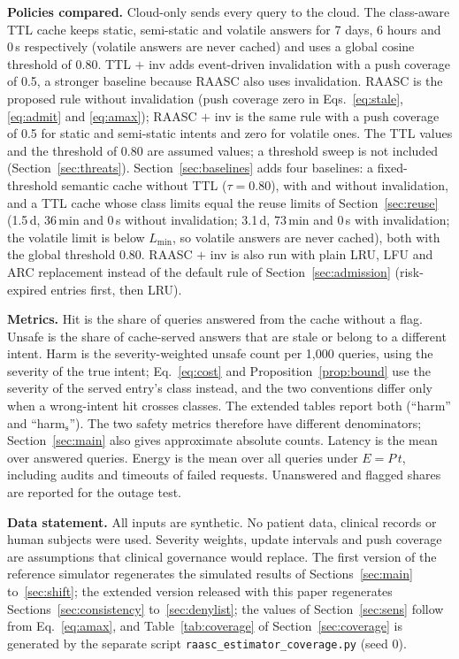 \documentclass[journal]{IEEEtran}
\begin{document}
\textbf{Policies compared.} Cloud-only sends every query to the cloud. The class-aware TTL cache keeps static, semi-static and volatile answers for 7 days, 6 hours and 0\,s respectively (volatile answers are never cached) and uses a global cosine threshold of 0.80. TTL $+$ inv adds event-driven invalidation with a push coverage of 0.5, a stronger baseline because RAASC also uses invalidation. RAASC is the proposed rule without invalidation (push coverage zero in Eqs.~\eqref{eq:stale}, \eqref{eq:admit} and \eqref{eq:amax}); RAASC $+$ inv is the same rule with a push coverage of 0.5 for static and semi-static intents and zero for volatile ones. The TTL values and the threshold of 0.80 are assumed values; a threshold sweep is not included (Section~\ref{sec:threats}). Section~\ref{sec:baselines} adds four baselines: a fixed-threshold semantic cache without TTL ($\tau=0.80$), with and without invalidation, and a TTL cache whose class limits equal the reuse limits of Section~\ref{sec:reuse} (1.5\,d, 36\,min and 0\,s without invalidation; 3.1\,d, 73\,min and 0\,s with invalidation; the volatile limit is below $L_{\min}$, so volatile answers are never cached), both with the global threshold 0.80. RAASC $+$ inv is also run with plain LRU, LFU and ARC \cite{megiddo2003} replacement instead of the default rule of Section~\ref{sec:admission} (risk-expired entries first, then LRU).

\textbf{Metrics.} Hit is the share of queries answered from the cache without a flag. Unsafe is the share of cache-served answers that are stale or belong to a different intent. Harm is the severity-weighted unsafe count per 1,000 queries, using the severity of the true intent; Eq.~\eqref{eq:cost} and Proposition~\ref{prop:bound} use the severity of the served entry's class instead, and the two conventions differ only when a wrong-intent hit crosses classes. The extended tables report both (``harm'' and ``harm$_{\text{s}}$''). The two safety metrics therefore have different denominators; Section~\ref{sec:main} also gives approximate absolute counts. Latency is the mean over answered queries. Energy is the mean over all queries under $E=P\,t$, including audits and timeouts of failed requests. Unanswered and flagged shares are reported for the outage test.

\textbf{Data statement.} All inputs are synthetic. No patient data, clinical records or human subjects were used. Severity weights, update intervals and push coverage are assumptions that clinical governance would replace. The first version of the reference simulator regenerates the simulated results of Sections~\ref{sec:main} to~\ref{sec:shift}; the extended version released with this paper regenerates Sections~\ref{sec:consistency} to~\ref{sec:denylist}; the values of Section~\ref{sec:sens} follow from Eq.~\eqref{eq:amax}, and Table~\ref{tab:coverage} of Section~\ref{sec:coverage} is generated by the separate script \texttt{raasc\_estimator\_coverage.py} (seed 0).
\end{document}

